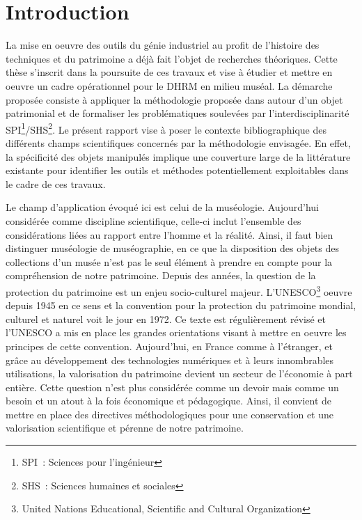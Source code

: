 \documentclass[a4paper,11pt,french]{article}
\begin{document}
\newpage
\tableofcontents
\newpage
\section{Introduction}

La mise en oeuvre des outils du génie industriel au profit de l'histoire des techniques et du patrimoine a déjà fait l'objet de recherches théoriques\cite{Laroche2007}. Cette thèse s'inscrit dans la poursuite de ces travaux et vise à étudier et mettre en oeuvre un cadre opérationnel pour le DHRM en milieu muséal.
La démarche proposée consiste à appliquer la méthodologie proposée dans \cite{Laroche2007} autour d'un objet patrimonial et de formaliser les problématiques soulevées par l'interdisciplinarité SPI\footnote{SPI~: Sciences pour l'ingénieur}/SHS\footnote{SHS~: Sciences humaines et sociales}.
Le présent rapport vise à poser le contexte bibliographique des différents champs scientifiques concernés par la méthodologie envisagée. En effet, la spécificité des objets manipulés implique une couverture large de la littérature existante pour identifier les outils et méthodes potentiellement exploitables dans le cadre de ces travaux.

Le champ d'application évoqué ici est celui de la muséologie. Aujourd'hui considérée comme discipline scientifique, celle-ci inclut l'ensemble des considérations liées au rapport entre l'homme et la réalité\cite{Desvallees2005}.
Ainsi, il faut bien distinguer muséologie de muséographie, en ce que la disposition des objets des collections d'un musée n'est pas le seul élément à prendre en compte pour la compréhension
de notre patrimoine. Depuis des années, la question de la protection du patrimoine est un enjeu socio-culturel majeur. L'UNESCO\footnote{United Nations Educational, Scientific and Cultural Organization} oeuvre depuis
1945 en ce sens et la convention pour la protection du patrimoine mondial, culturel et naturel voit le jour en 1972. Ce texte est régulièrement révisé et l'UNESCO a mis en place les grandes orientations
visant à mettre en oeuvre les principes de cette convention\cite{Unesco2008,Cotte2012}.
Aujourd'hui, en France comme à l'étranger, et grâce au développement des technologies numériques et à leurs innombrables utilisations, la valorisation du patrimoine devient un secteur de l'économie à part entière\cite{CAE2011}. Cette question
n'est plus considérée comme un devoir mais comme un besoin et un atout à la fois économique et pédagogique.
Ainsi, il convient de mettre en place des directives méthodologiques pour une conservation et une valorisation scientifique et pérenne de notre patrimoine\cite{LAROCHE-2008-422162}.
\end{document}
